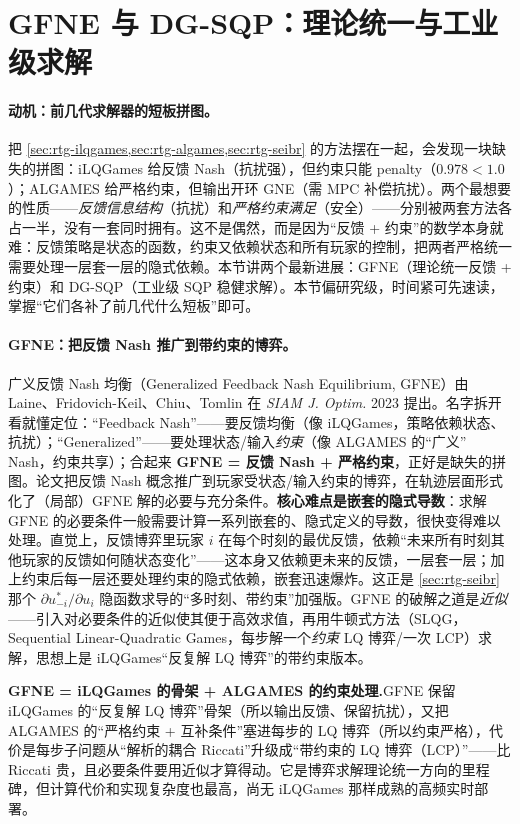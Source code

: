 \section{GFNE 与 DG-SQP：理论统一与工业级求解}
\label{sec:rtg-frontier}

\paragraph{动机：前几代求解器的短板拼图。}
把 \cref{sec:rtg-ilqgames,sec:rtg-algames,sec:rtg-seibr} 的方法摆在一起，会发现一块缺失的拼图：iLQGames 给反馈 Nash（抗扰强），但约束只能 penalty（$0.978<1.0$）；ALGAMES 给严格约束，但输出开环 GNE（需 MPC 补偿抗扰）。两个最想要的性质——\emph{反馈信息结构}（抗扰）和\emph{严格约束满足}（安全）——分别被两套方法各占一半，没有一套同时拥有。这不是偶然，而是因为“反馈 + 约束”的数学本身就难：反馈策略是状态的函数，约束又依赖状态和所有玩家的控制，把两者严格统一需要处理一层套一层的隐式依赖。本节讲两个最新进展：GFNE（理论统一反馈 + 约束）和 DG-SQP（工业级 SQP 稳健求解）。本节偏研究级，时间紧可先速读，掌握“它们各补了前几代什么短板”即可。

\paragraph{GFNE：把反馈 Nash 推广到带约束的博弈。}
广义反馈 Nash 均衡（Generalized Feedback Nash Equilibrium, GFNE）由 Laine、Fridovich-Keil、Chiu、Tomlin 在 \emph{SIAM J. Optim.} 2023 提出\cite{laine2023computation}。名字拆开看就懂定位：“Feedback Nash”——要反馈均衡（像 iLQGames，策略依赖状态、抗扰）；“Generalized”——要处理状态/输入\emph{约束}（像 ALGAMES 的“广义” Nash，约束共享）；合起来 \textbf{GFNE = 反馈 Nash + 严格约束}，正好是缺失的拼图。论文把反馈 Nash 概念推广到玩家受状态/输入约束的博弈，在轨迹层面形式化了（局部）GFNE 解的必要与充分条件。\textbf{核心难点是嵌套的隐式导数}：求解 GFNE 的必要条件一般需要计算一系列嵌套的、隐式定义的导数，很快变得难以处理。直觉上，反馈博弈里玩家 $i$ 在每个时刻的最优反馈，依赖“未来所有时刻其他玩家的反馈如何随状态变化”——这本身又依赖更未来的反馈，一层套一层；加上约束后每一层还要处理约束的隐式依赖，嵌套迅速爆炸。这正是 \cref{sec:rtg-seibr} 那个 $\partial u_{-i}^*/\partial u_i$ 隐函数求导的“多时刻、带约束”加强版。GFNE 的破解之道是\emph{近似}——引入对必要条件的近似使其便于高效求值，再用牛顿式方法（SLQG，Sequential Linear-Quadratic Games，每步解一个\emph{约束} LQ 博弈/一次 LCP）求解，思想上是 iLQGames“反复解 LQ 博弈”的带约束版本。

\begin{insight}
\textbf{GFNE = iLQGames 的骨架 + ALGAMES 的约束处理.}\;GFNE 保留 iLQGames 的“反复解 LQ 博弈”骨架（所以输出反馈、保留抗扰），又把 ALGAMES 的“严格约束 + 互补条件”塞进每步的 LQ 博弈（所以约束严格），代价是每步子问题从“解析的耦合 Riccati”升级成“带约束的 LQ 博弈（LCP）”——比 Riccati 贵，且必要条件要用近似才算得动。它是博弈求解理论统一方向的里程碑，但计算代价和实现复杂度也最高，尚无 iLQGames 那样成熟的高频实时部署。
\end{insight}

